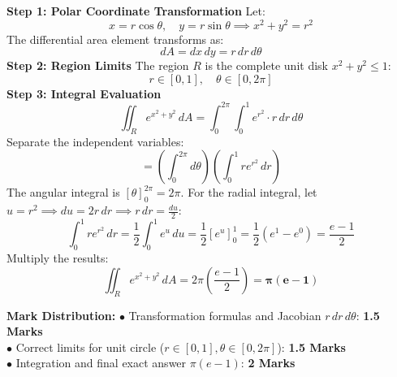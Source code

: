 \begin{solutionbox}
\textbf{Step 1: Polar Coordinate Transformation}
Let:
\[
x = r \cos\theta, \quad y = r \sin\theta \implies x^2 + y^2 = r^2
\]
The differential area element transforms as:
\[
dA = dx \, dy = r \, dr \, d\theta
\]
\textbf{Step 2: Region Limits}
The region $R$ is the complete unit disk $x^2 + y^2 \le 1$:
\[
r \in [0, 1], \quad \theta \in [0, 2\pi]
\]
\textbf{Step 3: Integral Evaluation}
\[
\iint_R e^{x^2+y^2} \, dA = \int_0^{2\pi} \int_0^1 e^{r^2} \cdot r \, dr \, d\theta
\]
Separate the independent variables:
\[
= \left( \int_0^{2\pi} d\theta \right) \left( \int_0^1 r e^{r^2} \, dr \right)
\]
The angular integral is $[ \theta ]_0^{2\pi} = 2\pi$.
For the radial integral, let $u = r^2 \implies du = 2r \, dr \implies r \, dr = \frac{du}{2}$:
\[
\int_0^1 r e^{r^2} \, dr = \frac{1}{2} \int_0^1 e^u \, du = \frac{1}{2} [e^u]_0^1 = \frac{1}{2}(e^1 - e^0) = \frac{e - 1}{2}
\]
Multiply the results:
\[
\iint_R e^{x^2+y^2} \, dA = 2\pi \left(\frac{e - 1}{2}\right) = \mathbf{\pi (e - 1)}
\]

\begin{markingrubric}
\textbf{Mark Distribution:}
$\bullet$ Transformation formulas and Jacobian $r \, dr \, d\theta$: \textbf{1.5 Marks}\\
$\bullet$ Correct limits for unit circle ($r \in [0,1], \theta \in [0, 2\pi]$): \textbf{1.5 Marks}\\
$\bullet$ Integration and final exact answer $\pi(e - 1)$: \textbf{2 Marks}
\end{markingrubric}
\end{solutionbox}


